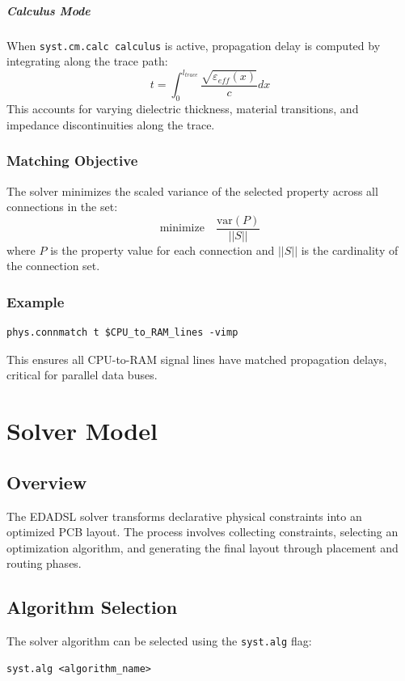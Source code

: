 \paragraph{Calculus Mode}
When \texttt{syst.cm.calc calculus} is active, propagation delay is computed by integrating along the trace path:
\begin{equation}
t = \int_0^{l_{trace}} \frac{\sqrt{\varepsilon_{eff}(x)}}{c} dx
\end{equation}
This accounts for varying dielectric thickness, material transitions, and impedance discontinuities along the trace.

\subsection{Matching Objective}
The solver minimizes the scaled variance of the selected property across all connections in the set:
\begin{equation}
\text{minimize} \quad \frac{\text{var}(P)}{||S||}
\end{equation}
where $P$ is the property value for each connection and $||S||$ is the cardinality of the connection set.

\subsection{Example}
\begin{verbatim}
phys.connmatch t $CPU_to_RAM_lines -vimp
\end{verbatim}
This ensures all CPU-to-RAM signal lines have matched propagation delays, critical for parallel data buses.


\chapter{Solver Model}
\label{sec:solver-model}

\section{Overview}
The EDADSL solver transforms declarative physical constraints into an optimized PCB layout. The process involves collecting constraints, selecting an optimization algorithm, and generating the final layout through placement and routing phases.

\section{Algorithm Selection}
The solver algorithm can be selected using the \texttt{syst.alg} flag:
\begin{verbatim}
syst.alg <algorithm_name>
\end{verbatim}

